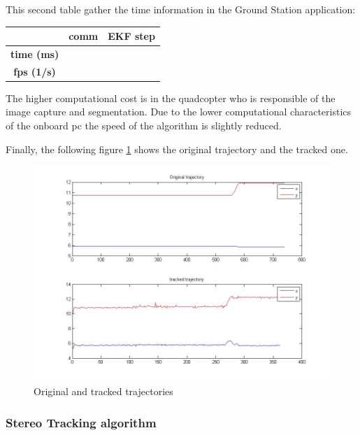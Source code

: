 	This second table gather the time information in the Ground Station application:
	\newline
	\newline
	{
	\centering
		\begin{tabular}{|c|c|c|}
		\hline  					&  comm		&  EKF step	\\
		\hline  \textbf{time (ms)}	& 			& 			\\
		\hline  \textbf{fps (1/s)}	&  			&  			\\
		\hline 
		\end{tabular} 
	}
	\newline
	
	The higher computational cost is in the quadcopter who is responsible of the image capture and segmentation. Due to the lower computational characteristics of the onboard pc the speed of the algorithm is slightly reduced.
	
	Finally, the following figure \ref{fig:arch_trajs} shows the original trajectory and the tracked one. %
	
	\begin{figure}[ph]
		\centering
		\includegraphics[width=\linewidth]{../Images/c4/arch_trajs}
		\caption{Original and tracked trajectories}
		\label{fig:arch_trajs}
	\end{figure}

	
	\subsubsection{Stereo Tracking algorithm}
